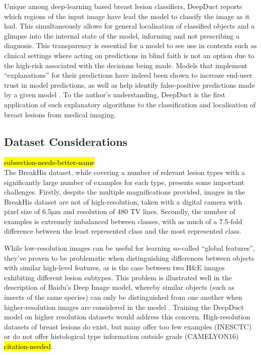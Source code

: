 Unique among deep-learning based breast lesion classifiers, DeepDuct reports which regions of the input image have lead the model to classify the image as it had. This simultaneously allows for general localisation of classified objects and a glimpse into the internal state of the model, informing and not prescribing a diagnosis. This transparency is essential for a model to see use in contexts such as clinical settings where acting on predictions in blind faith is not an option due to the high-risk associated with the decisions being made. Models that implement ``explanations'' for their predictions have indeed been shown to increase end-user trust in model predictions, as well as help identify false-positive predictions made by a given model \citep{ribeiro2016}. To the author's understanding, DeepDuct is the first application of such explanatory algorithms to the classification and localisation of breast lesions from medical imaging.\par

\subsection{Dataset Considerations}
\hl{subsection-needs-better-name}\\
The BreakHis dataset, while covering a number of relevant lesion types with a significantly large number of examples for each type, presents some important challenges. Firstly, despite the multiple magnifications provided, images in the BreakHis dataset are not of high-resolution, taken with a digital camera with pixel size of 6.5$\mathrm{\mu m}$ and resolution of 480 TV lines. Secondly, the number of examples is extremely imbalanced between classes, with as much of a 7.5-fold difference between the least represented class and the most represented class.\par

While low-resolution images can be useful for learning so-called ``global features'', they've proven to be problematic when distinguishing differences between objects with similar high-level features, as is the case between two H\&E images exhibiting different lesion subtypes. This problem is illustrated well in the description of Baidu's Deep Image model, whereby similar objects (such as insects of the same species) can only be distinguished from one another when higher-resolution images are considered in the model \citep{baidudeepimage}. Training the DeepDuct model on higher resolution datasets would address this concern. High-resolution datasets of breast lesions do exist, but many offer too few examples (INESCTC) or do not offer histological type information outside grade (CAMELYON16) \hl{citation-needed}.


